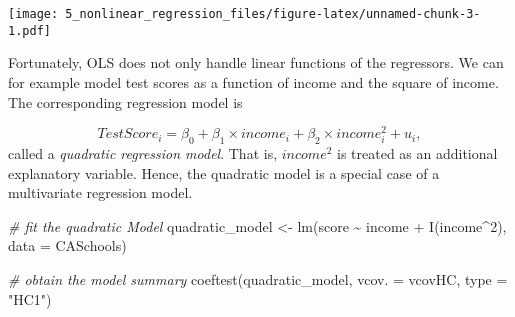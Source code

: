 \documentclass[
]{article}
\newenvironment{Shaded}{\begin{snugshade}}{\end{snugshade}}
\newcommand{\AttributeTok}[1]{\textcolor[rgb]{0.77,0.63,0.00}{#1}}
\newcommand{\CommentTok}[1]{\textcolor[rgb]{0.56,0.35,0.01}{\textit{#1}}}
\newcommand{\DecValTok}[1]{\textcolor[rgb]{0.00,0.00,0.81}{#1}}
\newcommand{\FloatTok}[1]{\textcolor[rgb]{0.00,0.00,0.81}{#1}}
\newcommand{\FunctionTok}[1]{\textcolor[rgb]{0.00,0.00,0.00}{#1}}
\newcommand{\NormalTok}[1]{#1}
\newcommand{\OtherTok}[1]{\textcolor[rgb]{0.56,0.35,0.01}{#1}}
\newcommand{\SpecialCharTok}[1]{\textcolor[rgb]{0.00,0.00,0.00}{#1}}
\newcommand{\StringTok}[1]{\textcolor[rgb]{0.31,0.60,0.02}{#1}}
\begin{document}
\begin{Shaded}
\end{Shaded}

\texttt{[image: 5\_nonlinear\_regression\_files/figure-latex/unnamed-chunk-3-1.pdf]}

Fortunately, OLS does not only handle linear functions of the
regressors. We can for example model test scores as a function of income
and the square of income. The corresponding regression model is

\[TestScore_i = \beta_0 + \beta_1 \times income_i + \beta_2 \times income_i^2 + u_i,\]
called a \emph{quadratic regression model}. That is, \(income^2\) is
treated as an additional explanatory variable. Hence, the quadratic
model is a special case of a multivariate regression model.

\begin{Shaded}
\begin{Highlighting}[]
\CommentTok{\# fit the quadratic Model}
\NormalTok{quadratic\_model }\OtherTok{\textless{}{-}} \FunctionTok{lm}\NormalTok{(score }\SpecialCharTok{\textasciitilde{}}\NormalTok{ income }\SpecialCharTok{+} \FunctionTok{I}\NormalTok{(income}\SpecialCharTok{\^{}}\DecValTok{2}\NormalTok{), }\AttributeTok{data =}\NormalTok{ CASchools)}

\CommentTok{\# obtain the model summary}
\FunctionTok{coeftest}\NormalTok{(quadratic\_model, }\AttributeTok{vcov. =}\NormalTok{ vcovHC, }\AttributeTok{type =} \StringTok{"HC1"}\NormalTok{)}
\end{Highlighting}
\end{Shaded}
\end{document}
